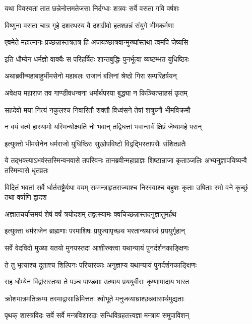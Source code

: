 \twolineshloka
{यथा विवस्वता तात छन्नेनोत्तमतेजसा}
{निर्दग्धाः शत्रवः सर्वे वसता गवि वर्षशः}


\twolineshloka
{विष्णुना वसता चात्र गृहे दशरथस्य वै}
{दशग्रीवो हतश्छन्नं संयुगे भीमकर्मणा}


\twolineshloka
{एवमेते महात्मानः प्रच्छन्नास्तत्रतत्र हि}
{अजयञ्छात्रवान्मुख्यांस्तथा त्वमपि जेष्यसि}



\twolineshloka
{इति धौम्येन धर्मज्ञो वाक्यैः स परिहर्षितः}
{शान्तबुद्धिः पुनर्भूत्वा व्यष्टम्भत युधिष्ठिरः}


\twolineshloka
{अथाब्रवीन्महाबाहुर्भीमसेनो महाबलः}
{राजानं बलिनां श्रेष्ठो गिरा सम्परिहर्षयन्}


\twolineshloka
{अवेक्षय महाराज तव गाण्डीवधन्वना}
{धर्मार्थपरया बुद्ध्या न किञ्चित्साहसं कृतम्}


\twolineshloka
{सहदेवो मया नित्यं नकुलश्च निवारितौ}
{शक्तौ विध्वंसने तेषां शत्रुघ्नौ भीमविक्रमौ}


\twolineshloka
{न वयं वर्त्म हास्यामो यस्मिन्योक्ष्यति नो भवान्}
{तद्विधत्तां भवान्सर्वं क्षिप्रं जेष्यामहे परान्}


\twolineshloka
{इत्युक्तो भीमसेनेन धर्मराजो युधिष्ठिरः}
{सुखोपविष्टो विद्वद्भिस्तापसैः संशितव्रतैः}


\threelineshloka
{ये तद्भक्त्याऽभवंस्तस्मिन्वनवासे तपस्विनः}
{तानब्रवीन्महाप्राज्ञः शिष्टान्राजा कृताञ्जलिः}
{अभ्यनुज्ञापयिष्यन्वै तस्मिन्वासे धृतव्रतः}


\threelineshloka
{विदितं भवतां सर्वे र्धार्तराष्ट्रैर्यथा वयम्}
{सम्मन्त्राहृतराज्याश्च निस्स्वाश्च बहुशः कृताः}
{उषिताः स्मो वने कृच्छ्रं तथा वर्षाणि द्वादश}


\twolineshloka
{अज्ञातचर्यासमयं शेषं वर्षं त्रयोदशम्}
{तद्वत्स्यामः क्वचिच्छन्नास्तदनुज्ञातुमर्हथ}


\twolineshloka
{इत्युक्ता धर्मराजेन ब्राह्मणाः परमाशिषः}
{प्रयुज्यापृच्छ्य भरतान्यथास्वं प्रययुर्गृहान्}


\twolineshloka
{सर्वे वेदविदो मुख्या यतयो मुनयस्तदा}
{आशीरुक्त्वा यथान्यायं पुनर्दर्शनकाङ्क्षिणः}


\twolineshloka
{ते तु भृत्याश्च दूताश्च शिल्पिनः परिचारकाः}
{अनुज्ञाप्य यथान्यायं पुनर्दर्शनकाङ्क्षिणः}


\twolineshloka
{सह धौम्येन विद्वांसस्तथा ते पञ्च पाण्डवाः}
{उत्थाय प्रययुर्वीराः कृष्णामादाय भारत}


\twolineshloka
{क्रोशमात्रमतिक्रम्य तस्माद्वासान्निमित्ततः}
{श्वोभूते मनुजव्याघ्राश्छन्नवासार्थमुद्यताः}


\twolineshloka
{पृथक् शास्त्रविदः सर्वे सर्वे मन्त्रविशारदाः}
{सन्धिविग्रहतत्त्वज्ञा मन्त्राय समुपाविशन्}

